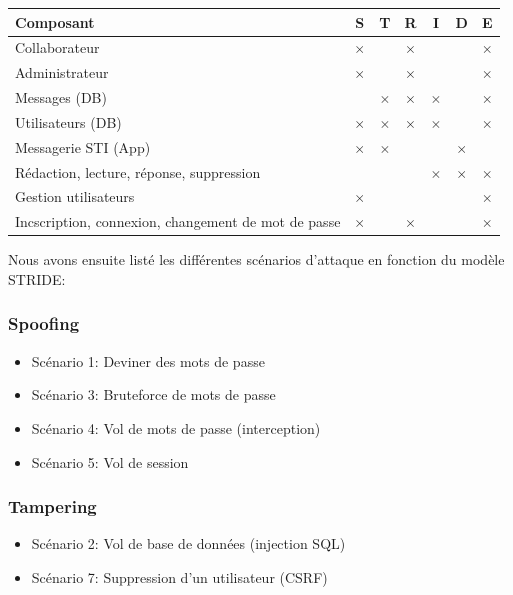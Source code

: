 \documentclass[a4paper,10pt]{article}
\begin{document}
\begin{center}
\begin{tabular}{|l c c c c c c|} 
 \hline
 Composant & S & T & R & I & D & E \\ [0.5ex] 
 \hline\hline
 Collaborateur & $\times$ & & $\times$ & & & $\times$\\
 \hline
 Administrateur & $\times$ & & $\times$ & & & $\times$ \\
 \hline
 Messages (DB) & & $\times$ & $\times$ & $\times$ &  & $\times$ \\
 \hline
 Utilisateurs (DB) & $\times$ & $\times$ & $\times$ & $\times$ &  & $\times$\\ 
 \hline
 Messagerie STI (App) & $\times$ & $\times$ &  &  & $\times$ & \\ 
 \hline
 Rédaction, lecture, réponse, suppression & & & & $\times$ & $\times$ & $\times$\\
 \hline
 Gestion utilisateurs & $\times$ & & & & & $\times$ \\ 
 \hline
 Incscription, connexion, changement de mot de passe & $\times$ & & $\times$ & & & $\times$\\  
 \hline
\end{tabular}
\end{center}
    
    Nous avons ensuite listé les différentes scénarios d'attaque en fonction du modèle STRIDE:
    \subsubsection*{Spoofing}
    \begin{onehalfspacing}
    \begin{itemize}
     \item Scénario 1: Deviner des mots de passe
     \item Scénario 3: Bruteforce de mots de passe
     \item Scénario 4: Vol de mots de passe (interception)
     \item Scénario 5: Vol de session
    \end{itemize}
    \end{onehalfspacing}
    \subsubsection*{Tampering}
    \begin{onehalfspacing}
    \begin{itemize}
     \item Scénario 2: Vol de base de données (injection SQL)
     \item Scénario 7: Suppression d'un utilisateur (CSRF)
    \end{itemize}
    \end{onehalfspacing}
\end{document}
